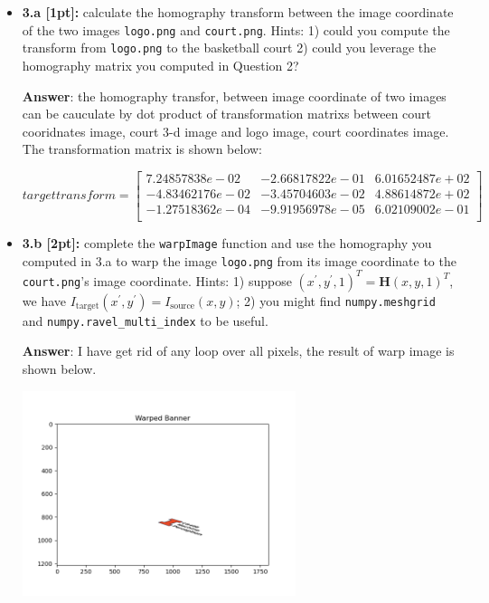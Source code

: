 \documentclass[11pt]{article}
\begin{document}
\begin{itemize}
\item \textbf{3.a [1pt]:} calculate the homography transform between the image coordinate of the two images \texttt{logo.png} and \texttt{court.png}. Hints: 1) could you compute the transform from \texttt{logo.png} to the basketball court 2) could you leverage the homography matrix you computed in Question 2? 

\textbf{Answer}: the homography transfor, between image coordinate of two images can be cauculate by dot product of transformation matrixs between court cooridnates image, court 3-d image and logo image, court coordinates image. The transformation matrix is shown below:

\[ targettransform = 
\left[
\begin{array}{ccc}
    7.24857838e-02 & -2.66817822e-01 & 6.01652487e+02 \\
    -4.83462176e-02  &-3.45704603e-02 & 4.88614872e+02 \\
    -1.27518362e-04 & -9.91956978e-05 & 6.02109002e-01 \\
\end{array}
\right]
\]

\item \textbf{3.b [2pt]:} complete the \texttt{warpImage} function and use the homography you computed in 3.a to warp the image \texttt{logo.png} from its image coordinate to the \texttt{court.png}'s image coordinate. Hints: 1) suppose $(x^\prime, y^\prime, 1)^T = \mathbf{H} (x, y, 1)^T$, we have $I_\mathrm{target}(x^\prime, y^\prime) = I_\mathrm{source}(x, y)$; 2) you might find \texttt{numpy.meshgrid} and \texttt{numpy.ravel\_multi\_index} to be useful. 

\textbf{Answer}: I have get rid of any loop over all pixels, the result of warp image is shown below.

\begin{center}
    \includegraphics[width=8cm]{fig/warped_banner.png}
\end{center}



\end{itemize}
\end{document}
